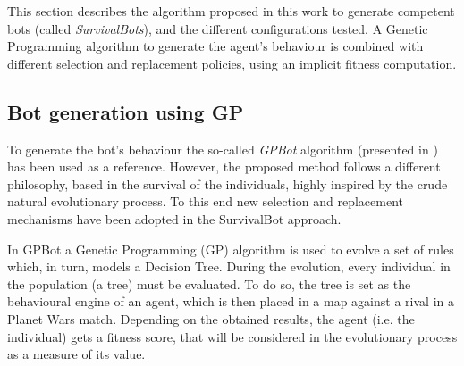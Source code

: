 \documentclass[conference]{IEEEtran}
\begin{document}





%

This section describes the algorithm proposed in this work to generate competent bots (called {\em SurvivalBots}), and the different configurations tested. A Genetic Programming \cite{GP_Koza92} algorithm to generate the agent's behaviour is combined with different selection and replacement policies, using an implicit fitness computation.


\subsection{Bot generation using GP}
\label{subsec:generationgp}

To generate the bot's behaviour the so-called {\em GPBot} algorithm (presented in \cite{GarciaGP14}) has been used as a reference. However, the proposed method follows a different philosophy, based in the survival of the individuals, highly inspired by the crude natural evolutionary process. To this end new selection and replacement mechanisms have been adopted in the SurvivalBot approach.

In GPBot a Genetic Programming (GP) algorithm is used to evolve a set of rules which, in turn, models a Decision Tree.
During the evolution, every individual in the population (a tree) must be evaluated. To do so, the tree is set as the behavioural engine of an agent, which is then placed in a map against a rival in a Planet Wars match. Depending on the obtained results, the agent (i.e. the individual) gets a fitness score, that will be considered in the evolutionary process as a measure of its value.
\end{document}
